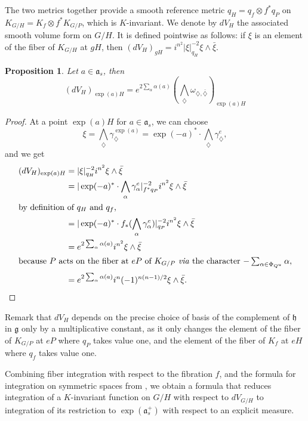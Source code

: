 \documentclass{amsart}
\newtheorem{prop}[thm]{Proposition}
\theoremstyle{definition}
\begin{document}
The two metrics together provide a smooth reference metric 
$q_H=q_f\otimes f^*q_P$ on 
$K_{G/H}=K_f\otimes f^*K_{G/P}$, which is $K$-invariant.
We denote by $dV_H$ the associated smooth volume form on $G/H$. 
It is defined pointwise as follows: if $\xi$ is an element of the fiber  
of $K_{G/H}$ at $gH$, then 
$(dV_H)_{gH} = i^{n^2}|\xi|_{q_{H}}^{-2} \xi \wedge \bar{\xi}$.

\begin{prop}
\label{prop_relation_volume_forms}
Let $a\in \mathfrak{a}_s$, then 
\[
(dV_H)_{\exp(a)H} = e^{2\sum_{\alpha} \alpha(a)}
\left(\bigwedge_{\diamondsuit} 
\omega_{\diamondsuit,\bar{\diamondsuit}}\right)_{\exp(a)H}
\]
\end{prop}

\begin{proof}
At a point $\exp(a)H$ for $a\in \mathfrak{a}_s$, we can choose 
\[
\xi = \bigwedge_{\diamondsuit} \gamma_{\diamondsuit}^{\exp(a)} 
= \exp(-a)^*\cdot \bigwedge_{\diamondsuit} \gamma_{\diamondsuit}^{e},
\] 
and we get 
\begin{align*}
(dV_H)_{\exp(a)H} & = |\xi|_{q_{H}}^{-2} i^{n^2}\xi \wedge \bar{\xi} \\
& = |\exp(-a)^*\cdot \bigwedge_{\alpha}\gamma_{\alpha}^e|_{f^*q_P}^{-2} i^{n^2}\xi \wedge \bar{\xi} \\
\intertext{by definition of $q_H$ and $q_f$,}
& = |\exp(-a)^*\cdot f_*(\bigwedge_{\alpha}\gamma_{\alpha}^e)|_{q_P}^{-2} i^{n^2}\xi \wedge \bar{\xi} \\
& = e^{2\sum_{\alpha} \alpha(a)}i^{n^2}\xi \wedge \bar{\xi} \\
\intertext{because $P$ acts on the fiber at $eP$ of $K_{G/P}$ \emph{via} the 
character $-\sum_{\alpha\in \Phi_{Q^u}}\alpha$,}
& = e^{2\sum_{\alpha} \alpha(a)}i^{n}(-1)^{n(n-1)/2}\xi \wedge \bar{\xi}.
\end{align*}
\end{proof}

Remark that $dV_H$ depends on the precise choice of basis of the complement 
of $\mathfrak{h}$ in $\mathfrak{g}$ only by a multiplicative constant, as 
it only changes the element of the fiber of $K_{G/P}$ at $eP$ where $q_P$ 
takes value one, and the element of the fiber of $K_f$ at $eH$ where 
$q_f$ takes value one. 

Combining fiber integration with respect to the fibration $f$, and 
the formula for integration on symmetric spaces from 
\cite[Theorem 2.6]{FJ80}, we obtain a formula that reduces integration 
of a $K$-invariant function on $G/H$ with respect to $dV_{G/H}$ to 
integration of its restriction to $\exp(\mathfrak{a}_s^+)$ with respect 
to an explicit measure. 
\end{document}
